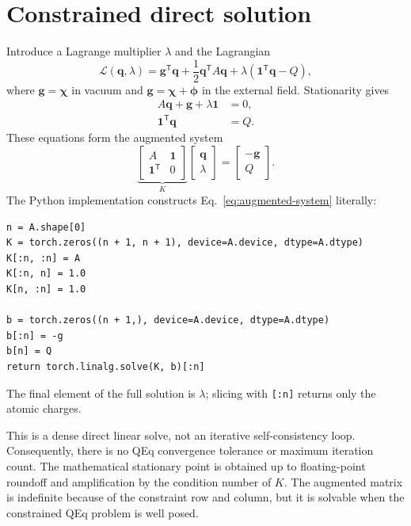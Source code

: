\documentclass[11pt,a4paper]{article}
\newcommand{\vect}[1]{\bm{#1}}
\newcommand{\ones}{\vect{1}}
\begin{document}
\section{Constrained direct solution}

Introduce a Lagrange multiplier $\lambda$ and the Lagrangian
\begin{equation}
  \mathcal L(\vect q,\lambda)
  =\vect g^{\mathsf T}\vect q
  +\frac{1}{2}\vect q^{\mathsf T}A\vect q
  +\lambda(\ones^{\mathsf T}\vect q-Q),
\end{equation}
where $\vect g=\vect\chi$ in vacuum and
$\vect g=\vect\chi+\vect\phi$ in the external field.  Stationarity gives
\begin{align}
  A\vect q+\vect g+\lambda\ones&=0,\\
  \ones^{\mathsf T}\vect q&=Q.
\end{align}
These equations form the augmented system
\begin{equation}
  \underbrace{
  \begin{bmatrix}
    A & \ones\\
    \ones^{\mathsf T} & 0
  \end{bmatrix}}_{K}
  \begin{bmatrix}
    \vect q\\ \lambda
  \end{bmatrix}
  =
  \begin{bmatrix}
    -\vect g\\ Q
  \end{bmatrix}.
  \label{eq:augmented-system}
\end{equation}
The Python implementation constructs Eq.~\eqref{eq:augmented-system} literally:
\begin{lstlisting}[style=pythonstyle]
n = A.shape[0]
K = torch.zeros((n + 1, n + 1), device=A.device, dtype=A.dtype)
K[:n, :n] = A
K[:n, n] = 1.0
K[n, :n] = 1.0

b = torch.zeros((n + 1,), device=A.device, dtype=A.dtype)
b[:n] = -g
b[n] = Q
return torch.linalg.solve(K, b)[:n]
\end{lstlisting}
The final element of the full solution is $\lambda$; slicing with
\texttt{[:n]} returns only the atomic charges.

This is a dense direct linear solve, not an iterative self-consistency loop.
Consequently, there is no QEq convergence tolerance or maximum iteration count.
The mathematical stationary point is obtained up to floating-point roundoff
and amplification by the condition number of $K$.  The augmented matrix is
indefinite because of the constraint row and column, but it is solvable when the
constrained QEq problem is well posed.
\end{document}
